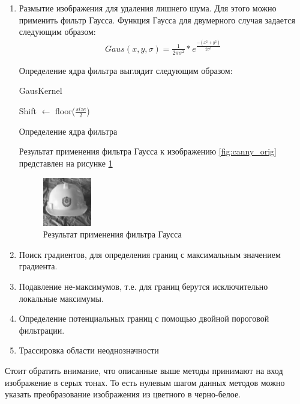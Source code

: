 \begin{enumerate}
	\item Размытие изображения для удаления лишнего шума. Для этого можно применить фильтр Гаусса.
	Функция Гаусса для двумерного случая задается следующим образом:
	\begin{eqnarray}\label{eq:gauss}
	Gaus(x, y, \sigma) = \frac{1}{2 \pi \sigma^2}*e^{\frac{-(x^2+y^2)}{2\sigma^2}}
	\end{eqnarray}
	
	Определение ядра фильтра выглядит следующим образом:
	
	\begin{algorithm}[H]
		GausKernel
		
		\SetAlgoLined
		
		Shift $\leftarrow$ floor($\frac{size}{2}$)
		
	
		\caption{Определение ядра фильтра}
		
	\end{algorithm}

	
	Результат применения фильтра Гаусса к изображению \ref{fig:canny_orig} представлен на рисунке \ref{fig:canny_smoothed}
	
	\begin{figure}[!h]
		\centering
		\includegraphics[width=0.2\textwidth,keepaspectratio]{figures/ru/bmstu_smoothed}
		\caption{Результат применения фильтра Гаусса}
		\label{fig:canny_smoothed}
	\end{figure}
	\item Поиск градиентов, для определения границ с максимальным значением градиента.
	\item Подавление не-максимумов, т.е. для границ берутся исключительно локальные максимумы.
	\item Определение потенциальных границ с помощью двойной пороговой фильтрации.
	\item Трассировка области неоднозначности
\end{enumerate}


Стоит обратить внимание, что описанные выше методы принимают на вход изображение в серых тонах. То есть нулевым шагом данных методов можно указать преобразование изображения из цветного в черно-белое.
